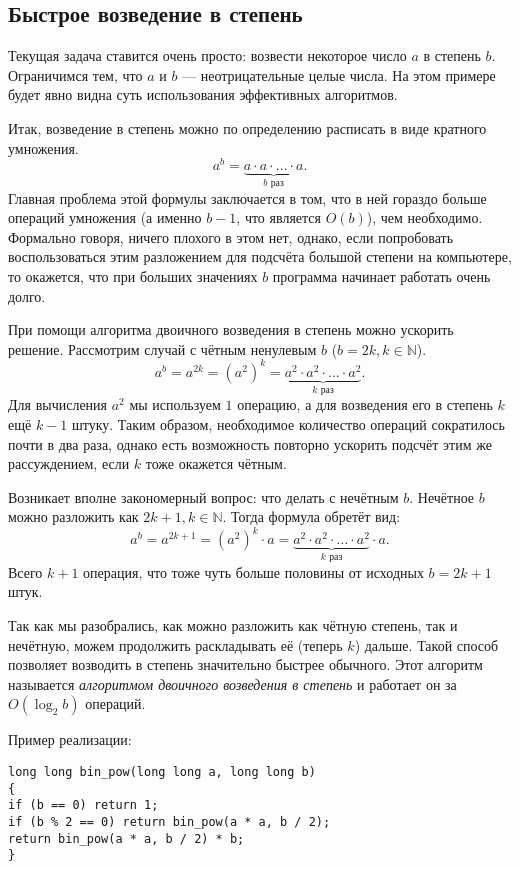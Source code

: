 \subsection{Быстрое возведение в степень}
Текущая задача ставится очень просто: возвести некоторое число \(a\) в степень \(b\). Ограничимся тем, что $a$ и $b$ --- неотрицательные целые числа. На этом примере будет явно видна суть использования эффективных алгоритмов.

Итак, возведение в степень можно по определению расписать в виде кратного умножения.
\[a^b=\underbrace{a \cdot a \cdot  \ldots \cdot a}_\text{\(b\) раз}.\]
Главная проблема этой формулы заключается в том, что в ней гораздо больше операций умножения (а именно $b - 1$, что является \(O(b)\)), чем необходимо. Формально говоря, ничего плохого в этом нет, однако, если попробовать воспользоваться этим разложением для подсчёта большой степени на компьютере, то окажется, что при больших значениях \(b\) программа начинает работать очень долго.

При помощи алгоритма двоичного возведения в степень можно ускорить решение. Рассмотрим случай с чётным ненулевым $b$ (\(b = 2k, k \in \mathbb{N}\)).
\[a^b = a^{2k} = (a^{2})^k = \underbrace{a^2 \cdot a^2 \cdot \ldots \cdot a^2}_\text{\(k\) раз}.\]
Для вычисления $a^2$ мы используем $1$ операцию, а для возведения его в степень $k$ ещё $k - 1$ штуку. Таким образом, необходимое количество операций сократилось почти в два раза, однако есть возможность повторно ускорить подсчёт этим же рассуждением, если $k$ тоже окажется чётным.

Возникает вполне закономерный вопрос: что делать с нечётным $b$. Нечётное $b$ можно разложить как $2k + 1, k \in \mathbb{N}$. Тогда формула обретёт вид:
\[a^b = a^{2k + 1} = (a^{2})^k \cdot a = \underbrace{a^2 \cdot a^2 \cdot \ldots \cdot a^2}_\text{\(k\) раз} \cdot a.\]
Всего $k + 1$ операция, что тоже чуть больше половины от исходных $b = 2k + 1$ штук.

Так как мы разобрались, как можно разложить как чётную степень, так и нечётную, можем продолжить раскладывать её (теперь $k$) дальше. Такой способ позволяет возводить в степень значительно быстрее обычного. Этот алгоритм называется \emph{алгоритмом двоичного возведения в степень} и работает он за \(O(\log_2{b})\) операций.


Пример реализации:
\begin{lstlisting}
long long bin_pow(long long a, long long b)
{
if (b == 0) return 1;
if (b % 2 == 0) return bin_pow(a * a, b / 2);
return bin_pow(a * a, b / 2) * b;
}
\end{lstlisting}